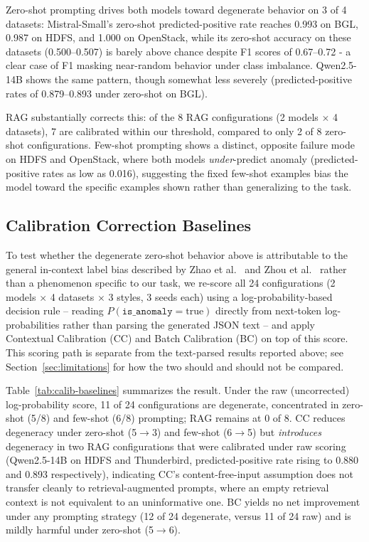 \documentclass[10pt,conference]{IEEEtran}
\begin{document}
Zero-shot prompting drives both models toward degenerate behavior on
3 of 4 datasets: Mistral-Small's zero-shot predicted-positive rate
reaches 0.993 on BGL, 0.987 on HDFS, and 1.000 on OpenStack, while its
zero-shot accuracy on these datasets (0.500--0.507) is barely above
chance despite F1 scores of 0.67--0.72 - a clear case of F1 masking
near-random behavior under class imbalance. Qwen2.5-14B shows the same
pattern, though somewhat less severely (predicted-positive rates of
0.879--0.893 under zero-shot on BGL).

RAG substantially corrects this: of the 8 RAG configurations (2 models
$\times$ 4 datasets), 7 are calibrated within our threshold, compared to
only 2 of 8 zero-shot configurations. Few-shot prompting shows a
distinct, opposite failure mode on HDFS and OpenStack, where both models
\emph{under}-predict anomaly (predicted-positive rates as low as 0.016),
suggesting the fixed few-shot examples bias the model toward the specific
examples shown rather than generalizing to the task.

\subsection{Calibration Correction Baselines}
\label{sec:calibration-rq2}

To test whether the degenerate zero-shot behavior above is attributable
to the general in-context label bias described by Zhao et
al.~\cite{zhao2021calibrate} and Zhou et al.~\cite{zhou2024batch} rather
than a phenomenon specific to our task, we re-score all 24 configurations
(2 models $\times$ 4 datasets $\times$ 3 styles, 3 seeds each) using a
log-probability-based decision rule -- reading $P(\texttt{is\_anomaly}=\text{true})$
directly from next-token log-probabilities rather than parsing the
generated JSON text -- and apply Contextual Calibration (CC) and Batch
Calibration (BC) on top of this score. This scoring path is separate from
the text-parsed results reported above; see
Section~\ref{sec:limitations} for how the two should and should not be
compared.

Table~\ref{tab:calib-baselines} summarizes the result. Under the raw
(uncorrected) log-probability score, 11 of 24 configurations are
degenerate, concentrated in zero-shot (5/8) and few-shot (6/8) prompting;
RAG remains at 0 of 8. CC reduces degeneracy under zero-shot (5$\to$3)
and few-shot (6$\to$5) but \emph{introduces} degeneracy in two RAG
configurations that were calibrated under raw scoring (Qwen2.5-14B on
HDFS and Thunderbird, predicted-positive rate rising to 0.880 and 0.893
respectively), indicating CC's content-free-input assumption does not
transfer cleanly to retrieval-augmented prompts, where an empty retrieval
context is not equivalent to an uninformative one. BC yields no net
improvement under any prompting strategy (12 of 24 degenerate, versus 11
of 24 raw) and is mildly harmful under zero-shot (5$\to$6).
\end{document}
